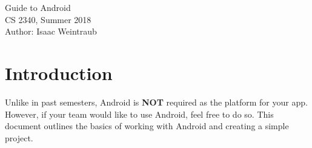 \documentclass{article}
\begin{document}
\begin{center}
{\huge Guide to Android}\\[0.5 cm]
{\large CS 2340, Summer 2018}\\[0.2 cm]
{\large Author: Isaac Weintraub}\\[0.2 cm]
\end{center}
\tableofcontents
\newpage
\section{Introduction}
Unlike in past semesters, Android is \textbf{NOT} required as the platform for your app. However, if your team would like to use Android, feel free to do so. This document outlines the basics of working with Android and creating a simple project.
\end{document}
